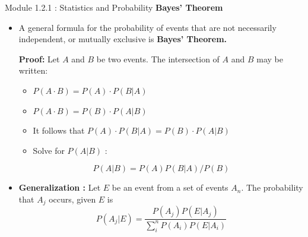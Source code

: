 \documentclass{beamer}
\begin{document}
\begin{frame}{Module 1.2.1 : Statistics and Probability}
\small
\textbf{Bayes' Theorem}
\begin{itemize}
\item
\scriptsize
A general formula for the probability of events that are not necessarily independent, or mutually exclusive is \textbf{Bayes' Theorem.}  \\ \vspace{0.25cm}

\textbf{Proof:} Let $A$ and $B$ be two events.  The intersection of $A$ and $B$ may be written:
\begin{itemize}
\scriptsize
\item $P(A \cdot B) = P(A) \cdot P(B|A)$
\item $P(A \cdot B) = P(B) \cdot P(A|B)$
\item It follows that $P(A) \cdot P(B|A) = P(B) \cdot P(A|B)$
\item Solve for $P(A|B)$ :
\end{itemize}
\begin{equation}
\boxed{
    P(A|B) = P(A) P(B|A) / P(B)
    }
\end{equation}
\item \textbf{Generalization : } Let $E$ be an event from a set of events $A_n$.  The probability that $A_j$ occurs, given $E$ is
\begin{equation}
    \boxed{
    P(A_j|E) = \frac{P(A_j) P(E|A_j)}{\sum_i^n P(A_i) P(E|A_i)}
    }
\end{equation}
\end{itemize}
\end{frame}
\end{document}
